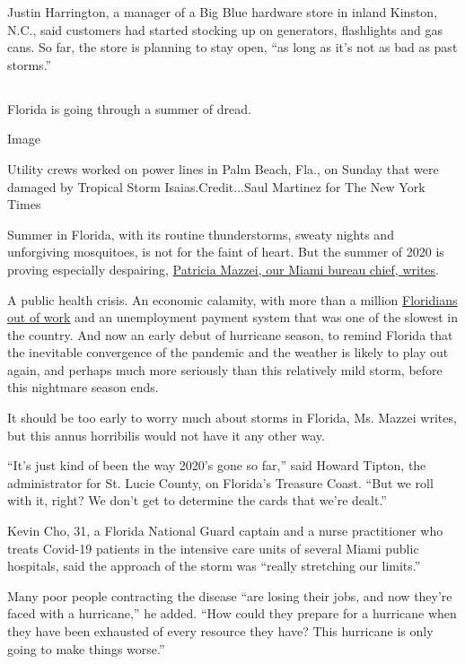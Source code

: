 Justin Harrington, a manager of a Big Blue hardware store in inland
Kinston, N.C., said customers had started stocking up on generators,
flashlights and gas cans. So far, the store is planning to stay open,
``as long as it's not as bad as past storms.''

\hypertarget{-5}{%
\subsection{}\label{-5}}

Florida is going through a summer of dread.

Image

Utility crews worked on power lines in Palm Beach, Fla., on Sunday that
were damaged by Tropical Storm Isaias.Credit...Saul Martinez for The New
York Times

Summer in Florida, with its routine thunderstorms, sweaty nights and
unforgiving mosquitoes, is not for the faint of heart. But the summer of
2020 is proving especially despairing,
\href{https://www.nytimes.com/2020/08/02/us/florida-hurricane-isaias-coronavirus.html}{Patricia
Mazzei, our Miami bureau chief, writes}.

A public health crisis. An economic calamity, with more than a million
\href{https://www.nytimes.com/2020/04/23/us/florida-coronavirus-unemployment.html}{Floridians
out of work} and an unemployment payment system that was one of the
slowest in the country. And now an early debut of hurricane season, to
remind Florida that the inevitable convergence of the pandemic and the
weather is likely to play out again, and perhaps much more seriously
than this relatively mild storm, before this nightmare season ends.

It should be too early to worry much about storms in Florida, Ms. Mazzei
writes, but this annus horribilis would not have it any other way.

``It's just kind of been the way 2020's gone so far,'' said Howard
Tipton, the administrator for St. Lucie County, on Florida's Treasure
Coast. ``But we roll with it, right? We don't get to determine the cards
that we're dealt.''

Kevin Cho, 31, a Florida National Guard captain and a nurse practitioner
who treats Covid-19 patients in the intensive care units of several
Miami public hospitals, said the approach of the storm was ``really
stretching our limits.''

Many poor people contracting the disease ``are losing their jobs, and
now they're faced with a hurricane,'' he added. ``How could they prepare
for a hurricane when they have been exhausted of every resource they
have? This hurricane is only going to make things worse.''

